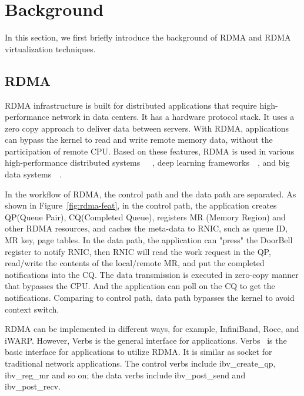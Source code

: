 \section{Background}
In this section, we first briefly introduce the background of RDMA and RDMA virtualization techniques.

\subsection{RDMA}
RDMA infrastructure is built for distributed applications that require high-performance network in data centers. It has a hardware protocol stack. It uses a zero copy approach to deliver data between servers. With RDMA, applications can bypass the kernel to read and write remote memory data, without the participation of remote CPU. Based on these features, RDMA is used in various high-performance distributed systems~\cite{dragojevic2014farm}~\cite{wei2015fast}~\cite{lu2017octopus}, deep learning frameworks~\cite{abadi2016tensorflow}~\cite{chen2015mxnet}, and big data systems~\cite{spark-rdma}~\cite{hadoop-rdma}.

In the workflow of RDMA, the control path and the data path are separated. As shown in Figure~\ref{fig:rdma-feat}, in the control path, the application creates QP(Queue Pair), CQ(Completed Queue), registers MR (Memory Region) and other RDMA resources, and caches the meta-data to RNIC, such as queue ID, MR key, page tables. In the data path, the application can "press" the DoorBell register to notify RNIC, then RNIC will read the work request in the QP, read/write the contents of the local/remote MR, and put the completed notifications into the CQ. The data transmission is executed in zero-copy manner that bypasses the CPU. And the application can poll on the CQ to get the notifications. Comparing to control path, data path bypasses the kernel to avoid context switch.

RDMA can be implemented in different ways, for example, InfiniBand, Roce, and iWARP. However, Verbs is the general interface for applications. Verbs~\cite{verbs} is the basic interface for applications to utilize RDMA. It is similar as socket for traditional network applications. The control verbs include ibv\_create\_qp, ibv\_reg\_mr and so on; the data verbs include ibv\_post\_send and ibv\_post\_recv. 


